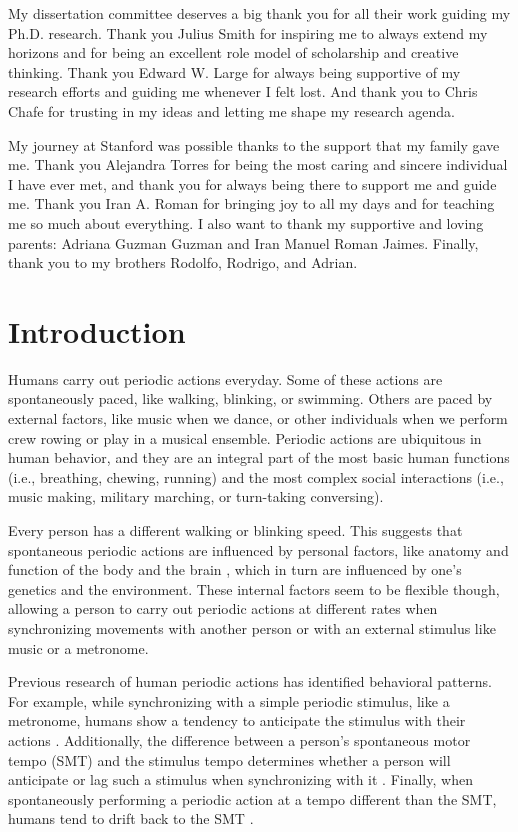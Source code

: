 \documentclass{report}
\begin{document}
My dissertation committee deserves a big thank you for all their work guiding my Ph.D. research. Thank you Julius Smith for inspiring me to always extend my horizons and for being an excellent role model of scholarship and creative thinking. Thank you Edward W. Large for always being supportive of my research efforts and guiding me whenever I felt lost. And thank you to Chris Chafe for trusting in my ideas and letting me shape my research agenda. 

My journey at Stanford was possible thanks to the support that my family gave me. Thank you Alejandra Torres for being the most caring and sincere individual I have ever met, and thank you for always being there to support me and guide me. Thank you Iran A. Roman for bringing joy to all my days and for teaching me so much about everything. I also want to thank my supportive and loving parents: Adriana Guzman Guzman and Iran Manuel Roman Jaimes. Finally, thank you to my brothers Rodolfo, Rodrigo, and Adrian.

\afterpreface

\chapter{Introduction}

Humans carry out periodic actions everyday. Some of these actions are spontaneously paced, like walking, blinking, or swimming. Others are paced by external factors, like music when we dance, or other individuals when we perform crew rowing or play in a musical ensemble. Periodic actions are ubiquitous in human behavior, and they are an integral part of the most basic human functions (i.e., breathing, chewing, running) and the most complex social interactions (i.e., music making, military marching, or turn-taking conversing).

Every person has a different walking or blinking speed. This suggests that spontaneous periodic actions are influenced by personal factors, like anatomy and function of the body \cite{goodman2000advantages} and the brain \cite{latash1992virtual}, which in turn are influenced by one's genetics and the environment. These internal factors seem to be flexible though, allowing a person to carry out periodic actions at different rates when synchronizing movements with another person or with an external stimulus like music or a metronome. 

Previous research of human periodic actions has identified behavioral patterns. For example, while synchronizing with a simple periodic stimulus, like a metronome, humans show a tendency to anticipate the stimulus with their actions \cite{repp2007tapping}. Additionally, the difference between a person's spontaneous motor tempo (SMT) and the stimulus tempo determines whether a person will anticipate or lag such a stimulus when synchronizing with it \cite{scheurich2018tapping}. Finally, when spontaneously performing a periodic action at a tempo different than the SMT, humans tend to drift back to the SMT \cite{zamm2018musicians}. 
\end{document}

